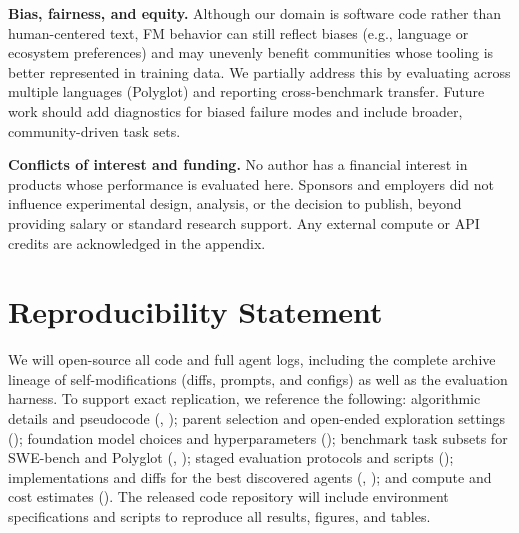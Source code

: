 \documentclass{article} %
\begin{document}
\textbf{Bias, fairness, and equity.}
Although our domain is software code rather than human-centered text, FM behavior can still reflect biases (e.g., language or ecosystem preferences) and may unevenly benefit communities whose tooling is better represented in training data. We partially address this by evaluating across multiple languages (Polyglot) and reporting cross-benchmark transfer. Future work should add diagnostics for biased failure modes and include broader, community-driven task sets.

\textbf{Conflicts of interest and funding.}
No author has a financial interest in products whose performance is evaluated here. Sponsors and employers did not influence experimental design, analysis, or the decision to publish, beyond providing salary or standard research support. Any external compute or API credits are acknowledged in the appendix.



\section*{Reproducibility Statement}
We will open-source all code and full agent logs, including the complete archive lineage of self-modifications (diffs, prompts, and configs) as well as the evaluation harness. To support exact replication, we reference the following: algorithmic details and pseudocode (, ); parent selection and open-ended exploration settings (); foundation model choices and hyperparameters (); benchmark task subsets for SWE-bench and Polyglot (, ); staged evaluation protocols and scripts (); implementations and diffs for the best discovered agents (, ); and compute and cost estimates (). The released code repository will include environment specifications and scripts to reproduce all results, figures, and tables.


\newpage

\end{document}
